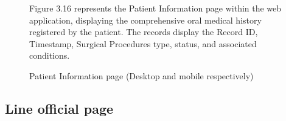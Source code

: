 \documentclass[12pt,oneside,openright,a4paper]{cpe-english-project}
\begin{document}
\begin{figure}[!h]
\begin{minipage}{.25\textwidth}
      \end{minipage}
      \caption{Patient Information page (Desktop and mobile respectively)}\label{fig:Patient Information page}
      \begin{flushleft}
        \qquad Figure 3.16 represents the Patient Information page within the web application, displaying the comprehensive oral medical history registered by the patient. The records display the Record ID, Timestamp, Surgical Procedures type, status, and associated conditions. \par
      \end{flushleft}
    \end{figure}
    \subsection{Line official page}
\end{document}
